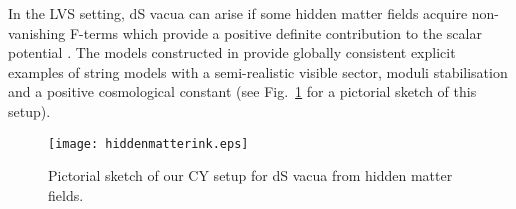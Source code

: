 \documentclass[11pt,a4paper]{article}
\begin{document}
In the LVS setting, dS vacua can arise if some hidden matter fields
acquire non-vanishing F-terms which provide a positive definite contribution to the scalar potential \cite{Cicoli:2012vw}.
The models constructed in \cite{Cicoli:2012vw} provide globally consistent explicit examples
of string models with a semi-realistic visible sector, moduli stabilisation and a positive cosmological constant
(see Fig.~\ref{Fig1} for a pictorial sketch of this setup).

\begin{figure}[t]
\begin{center}
\texttt{[image: hiddenmatterink.eps]}
\caption{Pictorial sketch of our CY setup for dS vacua from hidden matter fields.} \label{Fig1}
\end{center}
\end{figure}
\end{document}
